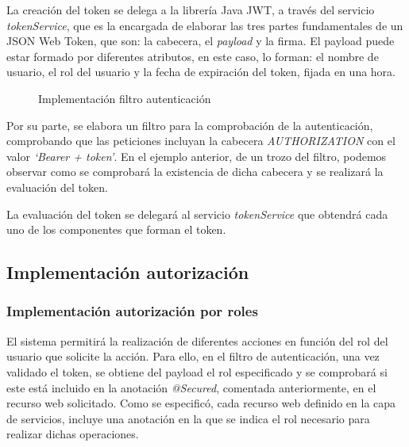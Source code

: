 La creación del token se delega a la librería Java JWT, a través del servicio \textit{tokenService}, que es la encargada de elaborar las tres partes fundamentales de un JSON Web Token, que son: la cabecera, el \textit{payload} y la firma. El payload puede estar formado por diferentes atributos, en este caso, lo forman: el nombre de usuario, el rol del usuario y la fecha de expiración del token, fijada en una hora. 




\begin{figure}[H]
\centering
{}
\caption{Implementación filtro autenticación}
\end{figure}

Por su parte, se elabora un filtro para la comprobación de la autenticación, comprobando que las peticiones incluyan la cabecera \textit{AUTHORIZATION} con el valor \textit{`Bearer + token'}. En el ejemplo anterior, de un trozo del filtro, podemos observar como se comprobará la existencia de dicha cabecera y se realizará la evaluación del token.

La evaluación del token se delegará al servicio \textit{tokenService} que obtendrá cada uno de los componentes que forman el token.


\subsection{Implementación autorización}
\subsubsection*{Implementación autorización por roles}
El sistema permitirá la realización de diferentes acciones en función del rol del usuario que solicite la acción. Para ello, en el filtro de autenticación, una vez validado el token, se obtiene del payload el rol especificado y se comprobará si este está incluido en la anotación \textit{@Secured}, comentada anteriormente, en el recurso web solicitado. Como se especificó, cada recurso web definido en la capa de servicios, incluye una anotación en la que se indica el rol necesario para realizar dichas operaciones.

